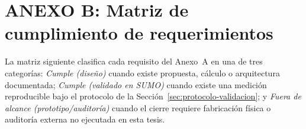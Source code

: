 \section*{ANEXO B: Matriz de cumplimiento de requerimientos}
\label{anexo:cumplimiento}

La matriz siguiente clasifica cada requisito del Anexo~A en una de tres categorías: \emph{Cumple (diseño)}
cuando existe propuesta, cálculo o arquitectura documentada; \emph{Cumple (validado en SUMO)} cuando existe
una medición reproducible bajo el protocolo de la Sección~\ref{sec:protocolo-validacion}; y \emph{Fuera de
alcance (prototipo/auditoría)} cuando el cierre requiere fabricación física o auditoría externa no ejecutada
en esta tesis.


